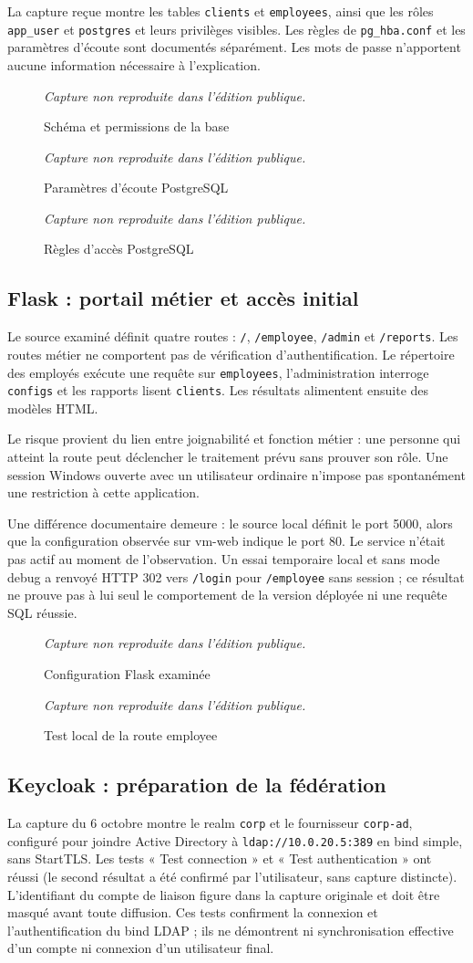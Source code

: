 \documentclass[a4paper,12pt]{report}
\newcommand{\publiccapture}[1]{%
  \begin{figure}[H]\centering
  {\footnotesize\itshape Capture non reproduite dans l'édition publique.}
  \caption{#1}\end{figure}}
\begin{document}
La capture reçue montre les tables \texttt{clients} et \texttt{employees}, ainsi que les rôles \texttt{app\_user} et \texttt{postgres} et leurs privilèges visibles. Les règles de \texttt{pg\_hba.conf} et les paramètres d'écoute sont documentés séparément. Les mots de passe n'apportent aucune information nécessaire à l'explication.
\publiccapture{Schéma et permissions de la base}
\publiccapture{Paramètres d'écoute PostgreSQL}
\publiccapture{Règles d'accès PostgreSQL}

\subsection{Flask : portail métier et accès initial}
Le source examiné définit quatre routes : \texttt{/}, \texttt{/employee}, \texttt{/admin} et \texttt{/reports}. Les routes métier ne comportent pas de vérification d'authentification. Le répertoire des employés exécute une requête sur \texttt{employees}, l'administration interroge \texttt{configs} et les rapports lisent \texttt{clients}. Les résultats alimentent ensuite des modèles HTML.

Le risque provient du lien entre joignabilité et fonction métier : une personne qui atteint la route peut déclencher le traitement prévu sans prouver son rôle. Une session Windows ouverte avec un utilisateur ordinaire n'impose pas spontanément une restriction à cette application.

Une différence documentaire demeure : le source local définit le port 5000, alors que la configuration observée sur vm-web indique le port 80. Le service n'était pas actif au moment de l'observation. Un essai temporaire local et sans mode debug a renvoyé HTTP 302 vers \texttt{/login} pour \texttt{/employee} sans session ; ce résultat ne prouve pas à lui seul le comportement de la version déployée ni une requête SQL réussie.
\publiccapture{Configuration Flask examinée}
\publiccapture{Test local de la route employee}

\subsection{Keycloak : préparation de la fédération}
La capture du 6 octobre montre le realm \texttt{corp} et le fournisseur \texttt{corp-ad}, configuré pour joindre Active Directory à \texttt{ldap://10.0.20.5:389} en bind simple, sans StartTLS. Les tests « Test connection » et « Test authentication » ont réussi (le second résultat a été confirmé par l'utilisateur, sans capture distincte). L'identifiant du compte de liaison figure dans la capture originale et doit être masqué avant toute diffusion. Ces tests confirment la connexion et l'authentification du bind LDAP ; ils ne démontrent ni synchronisation effective d'un compte ni connexion d'un utilisateur final.
\end{document}

